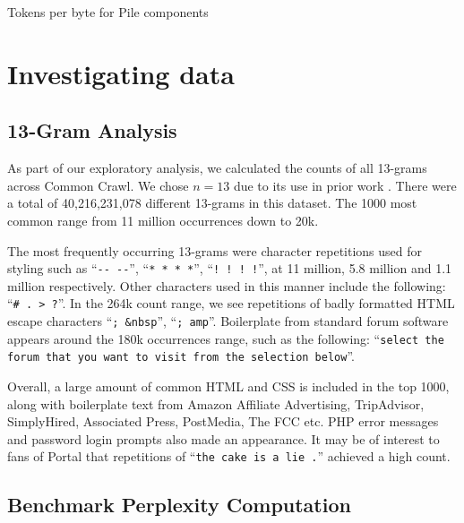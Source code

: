 \documentclass[11pt,a4paper]{article}
\begin{document}
\begin{appendices}
\begin{table}[t]
\caption{Tokens per byte for Pile components}
\label{tbl:bpb_conversion}
\end{table}


\section{Investigating data}
\subsection{13-Gram Analysis}


As part of our exploratory analysis, we calculated the counts of all 13-grams across Common Crawl. We chose $n=13$ due to its use in prior work \citep{GPT3}. There were a total of 40,216,231,078 different 13-grams in this dataset. The 1000 most common range from 11 million occurrences down to 20k.

The most frequently occurring 13-grams were character repetitions used for styling such as ``\texttt{-{}- -{}-}'', ``\texttt{* * * *}'', ``\texttt{! ! ! !}'', at 11 million, 5.8 million and 1.1 million respectively. Other characters used in this manner include the following: ``\texttt{\# . > ?}''. In the 264k count range, we see repetitions of badly formatted HTML escape characters ``\texttt{; \&nbsp}'', ``\texttt{; amp}''. Boilerplate from standard forum software appears around the 180k occurrences range, such as the following: ``\texttt{select the forum that you want to visit from the selection below}''.

Overall, a large amount of common HTML and CSS is included in the top 1000, along with boilerplate text from Amazon Affiliate Advertising, TripAdvisor, SimplyHired, Associated Press, PostMedia, The FCC etc. PHP error messages and password login prompts also made an appearance. It may be of interest to fans of Portal that repetitions of ``\texttt{the cake is a lie .}'' achieved a high count. 

\subsection{Benchmark Perplexity Computation}
\label{apdx:perplexity}


\end{appendices}
\end{document}
